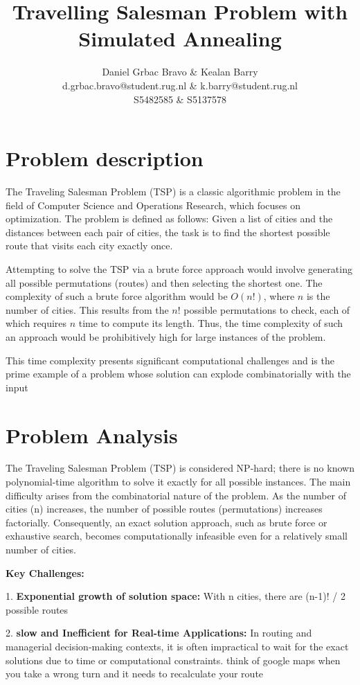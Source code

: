 \documentclass[a4paper,10pt]{article}
\title{Travelling Salesman Problem with Simulated Annealing}
\author{Daniel Grbac Bravo \& Kealan Barry\\
        d.grbac.bravo@student.rug.nl \& k.barry@student.rug.nl\\
        S5482585 \& S5137578}
\begin{document}
\maketitle

\section{Problem description}
The Traveling Salesman Problem (TSP) is a classic algorithmic problem in the field of Computer Science and Operations Research, which focuses on optimization. The problem is defined as follows: Given a list of cities and the distances between each pair of cities, the task is to find the shortest possible route that visits each city exactly once.

Attempting to solve the TSP via a brute force approach would involve generating all possible permutations (routes) and then selecting the shortest one. The complexity of such a brute force algorithm would be $O(n!)$, where $n$ is the number of cities. This results from the $n!$ possible permutations to check, each of which requires $n$ time to compute its length. Thus, the time complexity of such an approach would be prohibitively high for large instances of the problem.

This time complexity presents significant computational challenges and is the prime example of a problem whose solution can explode combinatorially with the input

\section{Problem Analysis}

The Traveling Salesman Problem (TSP) is considered NP-hard; there is no known polynomial-time algorithm to solve it exactly for all possible instances. The main difficulty arises from the combinatorial nature of the problem. As the number of cities (n) increases, the number of possible routes (permutations) increases factorially. Consequently, an exact solution approach, such as brute force or exhaustive search, becomes computationally infeasible even for a relatively small number of cities.

\textbf{Key Challenges:}

1. \textbf{Exponential growth of solution space:} With n cities, there are (n-1)! / 2 possible routes 

2. \textbf{slow and Inefficient for Real-time Applications:} In routing and managerial decision-making contexts, it is often impractical to wait for the exact solutions due to time or computational constraints. think of google maps when you take a wrong turn and it needs to recalculate your route
\end{document}
